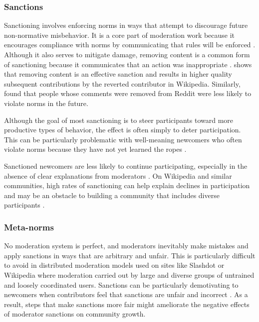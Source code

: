 \documentclass[format=acmsmall, natbib=true,  screen=true]{acmart}
\begin{document}
\subsubsection{Sanctions}

Sanctioning involves enforcing norms in ways that attempt to discourage future non-normative misbehavior. It is a core part of moderation work because it encourages compliance with norms by communicating that rules will be enforced \cite{jhaver_did_2019, srinivasan_content_2019}. Although it also serves to mitigate damage, removing content is a common form of sanctioning because it communicates that an action was inappropriate \citep{piskorski_testing_2017}. \citet{halfaker_dont_2011} shows that removing content is an effective sanction and results in higher quality subsequent contributions by the reverted contributor in Wikipedia. Similarly, \citet{srinivasan_content_2019} found that people whose comments were removed from Reddit were less likely to violate norms in the future.


Although the goal of most sanctioning is to steer participants toward more productive types of behavior, the effect is often simply to deter participation. This can be particularly problematic with well-meaning newcomers who often violate norms because they have not yet learned the ropes \cite{adler_content-driven_2007, halfaker_dont_2011, halfaker_rise_2013}.


Sanctioned newcomers are less likely to continue participating, especially in the absence of clear explanations from moderators \cite{jhaver_did_2019, kraut_regulating_2012, potthast_automatic_2008, halfaker_rise_2013, teblunthuis_revisiting_2018}.
On Wikipedia and similar communities, high rates of sanctioning can help explain declines in participation and may be an obstacle to building a community that includes diverse participants \cite{halfaker_rise_2013, teblunthuis_revisiting_2018, lam_wp:clubhouse?:_2011}. 


\subsubsection{Meta-norms}


No moderation system is perfect, and moderators inevitably make mistakes and apply sanctions in ways that are arbitrary and unfair. This is particularly difficult to avoid in distributed moderation models used on sites like Slashdot or Wikipedia where moderation carried out by large and diverse groups of untrained and loosely coordinated users.
Sanctions can be particularly demotivating to newcomers when contributors feel that sanctions are unfair and incorrect \citep{srinivasan_content_2019, jhaver_did_2019, gillespie_custodians_2018}.
As a result, steps that make sanctions more fair might ameliorate the negative effects of moderator sanctions on community growth.
\end{document}
